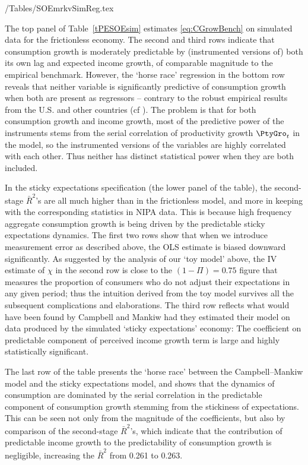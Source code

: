 \documentclass[titlepage]{\econtex}\newcommand{\texname}{cAndCwithStickyE}
\begin{document}
\econtexRoot/Tables/SOEmrkvSimReg.tex

The top panel of Table~\ref{tPESOEsim} estimates \eqref{eq:CGrowBench} on simulated data for the frictionless economy.  The second and third rows indicate that consumption growth is moderately predictable by (instrumented versions of) both its own lag and expected income growth, of comparable magnitude to the empirical benchmark.  However, the `horse race' regression in the bottom row reveals that neither variable is significantly predictive of consumption growth when both are present as regressors -- contrary to the robust empirical results from the U.S. and other countries (cf \cite{cssIntlStickyC}).  The problem is that for both consumption growth and income growth, most of the predictive power of the instruments stems from the serial correlation of productivity growth $\PtyGro_t$ in the model, so the instrumented versions of the variables are highly correlated with each other.  Thus neither has distinct statistical power when they are both included.

In the sticky expectations specification (the lower panel of the table), the second-stage $\bar{R}^{2}$'s are all much higher than in the frictionless model, and more in keeping with the corresponding statistics in NIPA data. This is because high frequency aggregate consumption growth is being driven by the predictable sticky expectations dynamics. The first two rows show that when we introduce measurement error as described above, the OLS estimate is biased downward significantly. As suggested by the analysis of our `toy model' above, the IV estimate of $\chi$ in the second row is close to the $(1-\Pi)=0.75$ figure that measures the proportion of consumers who do not adjust their expectations in any given period; thus the intuition derived from the toy model survives all the subsequent complications and elaborations. The third row reflects what would have been found by Campbell and Mankiw had they estimated their model on data produced by the simulated `sticky expectations' economy:  The coefficient on predictable component of perceived income growth term is large and highly statistically significant.

The last row of the table presents the `horse race' between the Campbell--Mankiw model and the sticky expectations model, and shows that the dynamics of consumption are dominated by the serial correlation in the predictable component of consumption growth stemming from the stickiness of expectations.  This can be seen not only from the magnitude of the coefficients, but also by comparison of the second-stage $\bar{R}^{2}$'s, which indicate that the contribution of predictable income growth to the predictability of consumption growth is negligible, increasing the $\bar{R}^2$ from 0.261 to 0.263.
\end{document}
